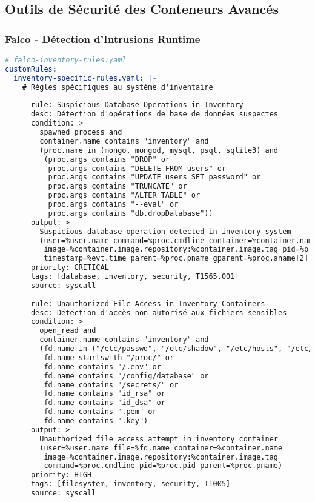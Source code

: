 \documentclass[12pt,a4paper]{report}
\begin{document}
\subsection{Outils de Sécurité des Conteneurs Avancés}

\subsubsection{Falco - Détection d'Intrusions Runtime}

\begin{lstlisting}[language=YAML, caption=Configuration Falco avancée pour conteneurs]
# falco-inventory-rules.yaml
customRules:
  inventory-specific-rules.yaml: |-
    # Règles spécifiques au système d'inventaire
    
    - rule: Suspicious Database Operations in Inventory
      desc: Détection d'opérations de base de données suspectes
      condition: >
        spawned_process and 
        container.name contains "inventory" and
        (proc.name in (mongo, mongod, mysql, psql, sqlite3) and
         (proc.args contains "DROP" or
          proc.args contains "DELETE FROM users" or
          proc.args contains "UPDATE users SET password" or
          proc.args contains "TRUNCATE" or
          proc.args contains "ALTER TABLE" or
          proc.args contains "--eval" or
          proc.args contains "db.dropDatabase"))
      output: >
        Suspicious database operation detected in inventory system
        (user=%user.name command=%proc.cmdline container=%container.name 
         image=%container.image.repository:%container.image.tag pid=%proc.pid 
         timestamp=%evt.time parent=%proc.pname gparent=%proc.aname[2])
      priority: CRITICAL
      tags: [database, inventory, security, T1565.001]
      source: syscall
    
    - rule: Unauthorized File Access in Inventory Containers
      desc: Détection d'accès non autorisé aux fichiers sensibles
      condition: >
        open_read and 
        container.name contains "inventory" and
        (fd.name in ("/etc/passwd", "/etc/shadow", "/etc/hosts", "/etc/hostname") or
         fd.name startswith "/proc/" or
         fd.name contains "/.env" or
         fd.name contains "/config/database" or
         fd.name contains "/secrets/" or
         fd.name contains "id_rsa" or
         fd.name contains "id_dsa" or
         fd.name contains ".pem" or
         fd.name contains ".key")
      output: >
        Unauthorized file access attempt in inventory container
        (user=%user.name file=%fd.name container=%container.name 
         image=%container.image.repository:%container.image.tag 
         command=%proc.cmdline pid=%proc.pid parent=%proc.pname)
      priority: HIGH
      tags: [filesystem, inventory, security, T1005]
      source: syscall
    

\end{lstlisting}
\end{document}
